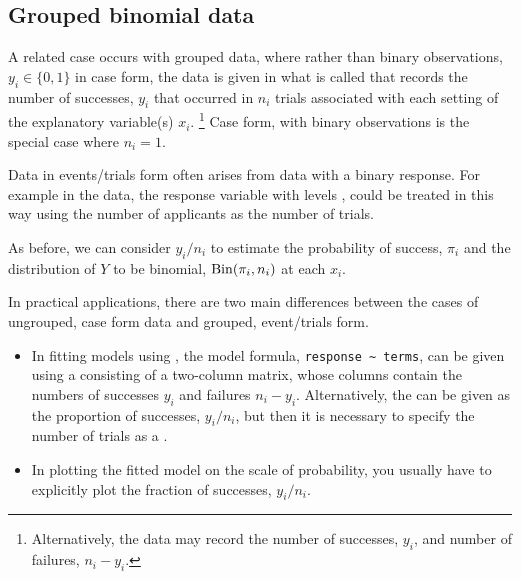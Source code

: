 \documentclass[11pt]{book}\usepackage[]{graphicx}\usepackage[]{color}
\begin{document}
\subsection{Grouped binomial data}\label{sec:logist-grouped}
A related case occurs with grouped data, where rather than binary observations,
$y_i \in \{0, 1\}$ in case form, 
the data is given in what is called
 that 
records the number of successes, $y_i$ that
occurred in $n_i$ trials associated with each setting of the explanatory
variable(s) $x_i$.%
\footnote{
Alternatively, the data may record the number of
successes, $y_i$, and number of failures, $n_i - y_i$.
}
Case form, with binary observations is the special case where $n_i=1$.

Data in events/trials form often arises from \ctab data with a
binary response. For example in the  data,
the response variable  with levels ,
 could be treated in this way using
the number of applicants as the number of trials.

As before, we can consider $y_i/n_i$ to estimate the probability of success, $\pi_i$
and the distribution of $Y$ to be binomial, $\Bin(\pi_i, n_i)$ at each $x_i$.

In practical applications, there are two main differences between the 
cases of ungrouped, case form data and grouped, event/trials form.

\begin{itemize}

 \item In fitting models using , the model formula, \verb|response ~ terms|, 
 can be given 
 using a  consisting of a 
 two-column matrix, whose columns contain the numbers of successes $y_i$ 
 and failures $n_i - y_i$.
 Alternatively, the  can be given as the proportion of successes,
 $y_i / n_i$, but then it is necessary to specify the number of trials as a
 .
 
 \item In plotting the fitted model on the scale of probability, you usually
 have to explicitly plot the fraction of successes, $y_i/n_i$.

\end{itemize}
\end{document}
